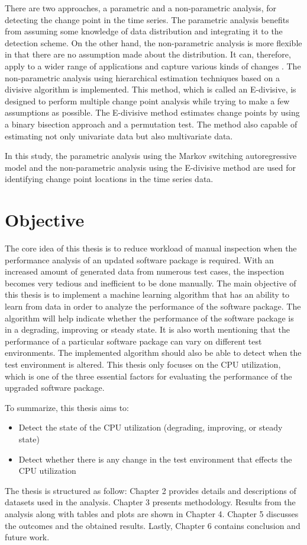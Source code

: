 There are two approaches, a parametric and a non-parametric analysis,
for detecting the change point in the time series. The parametric
analysis benefits from assuming some knowledge of data distribution
and integrating it to the detection scheme. On the other hand, the
non-parametric analysis is more flexible in that there are no assumption
made about the distribution. It can, therefore, apply to a wider range
of applications and capture various kinds of changes \citep{sharkey2014nonparametric}.
The non-parametric analysis using hierarchical estimation techniques
based on a divisive algorithm is implemented. This method, which is
called an E-divisive, is designed to perform multiple change point
analysis while trying to make a few assumptions as possible. The E-divisive
method estimates change points by using a binary bisection approach
and a permutation test. The method also capable of estimating not
only univariate data but also multivariate data. 

In this study, the parametric analysis using the Markov switching
autoregressive model and the non-parametric analysis using the E-divisive
method are used for identifying change point locations in the time
series data. 

\section{Objective \label{sec:Objective}}

The core idea of this thesis is to reduce workload of manual inspection
when the performance analysis of an updated software package is required.
With an increased amount of generated data from numerous test cases,
the inspection becomes very tedious and inefficient to be done manually.
The main objective of this thesis is to implement a machine learning
algorithm that has an ability to learn from data in order to analyze
the performance of the software package. The algorithm will help indicate
whether the performance of the software package is in a degrading,
improving or steady state. It is also worth mentioning that the performance
of a particular software package can vary on different test environments.
The implemented algorithm should also be able to detect when the test
environment is altered. This thesis only focuses on the CPU utilization,
which is one of the three essential factors for evaluating the performance
of the upgraded software package.

To summarize, this thesis aims to:
\begin{itemize}
\item Detect the state of the CPU utilization (degrading, improving, or
steady state)
\item Detect whether there is any change in the test environment that effects
the CPU utilization
\end{itemize}
The thesis is structured as follow: Chapter 2 provides details and
descriptions of datasets used in the analysis. Chapter 3 presents
methodology. Results from the analysis along with tables and plots
are shown in Chapter 4. Chapter 5 discusses the outcomes and the obtained
results. Lastly, Chapter 6 contains conclusion and future work.


